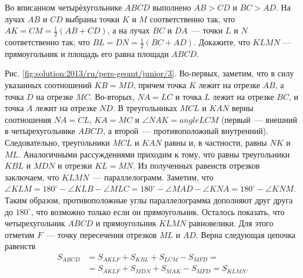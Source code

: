 \problem
Во вписанном четырёхугольнике $ABCD$ выполнено $AB > CD$ и $BC > AD$.
На лучах $AB$ и $CD$ выбраны точки $K$ и $M$ соответственно так, что
$AK = CM = \frac{1}{2} (AB + CD)$,
а на лучах $BC$ и $DA$~--- точки $L$ и $N$ соответственно так, что
$BL = DN = \frac{1}{2} (BC + AD)$.
Докажите, что $KLMN$ --- прямоугольник и 
площадь его равна площади $ABCD$.

%
\label{solution:2013/ru/pers-geomt/junior/3}
Рис. \ref{fig:solution:2013/ru/pers-geomt/junior/3}.
Во-первых, заметим, что в силу указанных соотношений $KB = MD$, причем точка
$K$ лежит на отрезке $AB$, а точка $D$ на отрезке $MC$.
Во-вторых, $NA = LC$ и точка $L$ лежит на отрезке $BC$, и точка $A$ лежит на
отрезке $ND$.
В треугольниках $MCL$ и $KAN$ верны соотношения $NA = CL$, $KA = MC$ и
$\angle NAK = angle LCM$ (первый~--- внешний в четырехугольнике $ABCD$, а
второй~--- противоположный внутренний).
Следовательно, треугольники $MCL$ и $KAN$ равны и, в частности, равны $NK$ и
$ML$.
Аналогичными рассуждениями приходим к тому, что равны треугольники $KBL$ и
$MDN$ и отрезки $KL = MN$.
Из полученных равенств отрезков заключаем, что $KLMN$~--- параллелограмм.
Заметим, что
\(
    \angle KLM
=
    180^\circ - \angle KLB - \angle MLC
=
    180^\circ - \angle MAD - \angle KNA
=
    180^\circ - \angle KNM
\).
Таким образом, противоположные углы параллелограмма дополняют друг друга до
$180^\circ$, что возможно только если он прямоугольник.
Осталось показать, что четырехугольник $ABCD$ и прямоугольник $KLMN$
равновелики.
Для этого отметим $F$~--- точку пересечения отрезков $ML$ и $AD$.
Верна следующая цепочка равенств
\begin{align*}
    S_{ABCD}
&{}=
    S_{AKLF} + S_{KBL} + S_{LCM} - S_{MFD}
=\\&{}=
    S_{AKLF} + S_{MDN} + S_{MAK} - S_{MFD}
=
    S_{KLMN}.
\end{align*}
\endproblem
